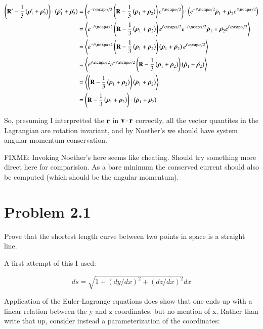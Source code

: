 \documentclass{article}
\newcommand{\Brho}[0]{\boldsymbol{\rho}}
\newcommand{\gpgrade}[2] {{\left\langle{{#1}}\right\rangle}_{#2}}
\newcommand{\gpgradezero}[1] {\gpgrade{#1}{}}
\begin{document}
\begin{align*}
\left( \BR' - \inv{3}\left(\Brho_1' + \Brho_2'\right) \right) \cdot \left({\dot{\Brho}}_1' + {\dot{\Brho}}_2'\right) 
&= 
\left(e^{-i\ncap \alpha/2} \left( \BR - \inv{3}\left(\Brho_1 + \Brho_2\right) \right) e^{i\ncap\alpha/2}\right) \cdot
\left(e^{-i\ncap \alpha/2} \dot{\Brho}_1 + \dot{\Brho_2} e^{i\ncap\alpha/2}\right) \\
&= 
\gpgradezero{
e^{-i\ncap \alpha/2} \left( \BR - \inv{3}\left(\Brho_1 + \Brho_2\right) \right) e^{i\ncap\alpha/2}
e^{-i\ncap \alpha/2} \dot{\Brho}_1 + \dot{\Brho_2} e^{i\ncap\alpha/2}
} \\
&= 
\gpgradezero{
e^{-i\ncap \alpha/2} \left( \BR - \inv{3}\left(\Brho_1 + \Brho_2\right) \right) \left(\dot{\Brho}_1 + \dot{\Brho_2}\right) e^{i\ncap\alpha/2}
} \\
&= 
\gpgradezero{
e^{i\ncap\alpha/2}
e^{-i\ncap \alpha/2} \left( \BR - \inv{3}\left(\Brho_1 + \Brho_2\right) \right) \left(\dot{\Brho}_1 + \dot{\Brho_2}\right) 
} \\
&= 
\gpgradezero{
\left( \BR - \inv{3}\left(\Brho_1 + \Brho_2\right) \right) \left(\dot{\Brho}_1 + \dot{\Brho_2}\right) 
} \\
&= 
\left( \BR - \inv{3}\left(\Brho_1 + \Brho_2\right) \right) \cdot \left(\dot{\Brho}_1 + \dot{\Brho_2}\right) 
\end{align*}

So, presuming I interpretted the $\mathbf{r}$ in $\mathbf{v} \cdot \mathbf{r}$ correctly,
all the vector quantites in the Lagrangian are rotation invariant, and by Noether's we should have system angular momentum 
conservation.

FIXME: Invoking Noether's here seems like cheating.  Should try something more direct here for comparision.  As a bare minimum the conserved current should
also be computed (which should be the angular momentum).

\section{ Problem 2.1 }

Prove that the shortest length curve between two points in space is a straight line.

A first attempt of this I used:

\begin{equation*}
ds = \sqrt{ 1 + (dy/dx)^2 + (dz/dx)^2 } dx
\end{equation*}

Application of the Euler-Lagrange equations does show that one ends up with a linear relation between the y and z coordinates, but no mention of x.  Rather than write that up, consider instead a parameterization of the coordinates:
\end{document}
